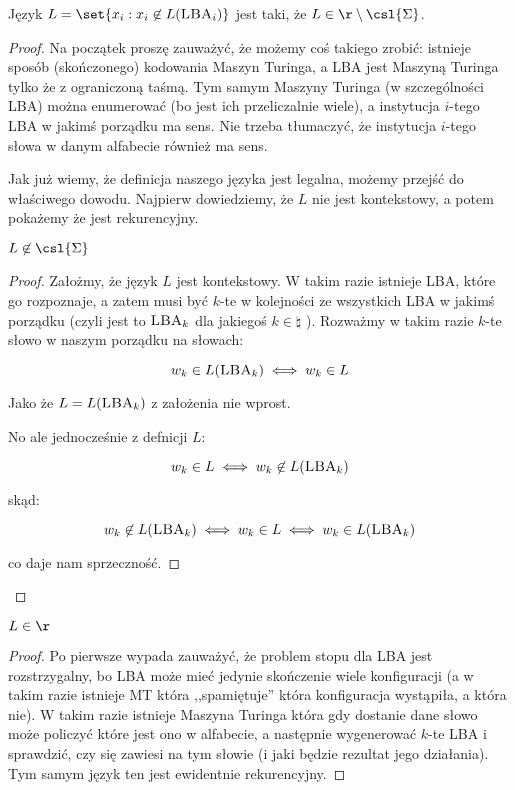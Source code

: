 \begin{theorem}
    Język \( L = \set{x_i : x_i \not \in L(\textsc{LBA}_i)} \) jest taki, że \( L \in \r \setminus \csl{\Sigma}\).
\end{theorem}
\begin{proof}
    Na początek proszę zauważyć, że możemy coś takiego zrobić: istnieje sposób (skończonego) kodowania Maszyn Turinga, a LBA jest Maszyną Turinga tylko że z ograniczoną taśmą. Tym samym Maszyny Turinga (w szczególności LBA) można enumerować (bo jest ich przeliczalnie wiele), a instytucja \(i\)-tego LBA w jakimś porządku ma sens. Nie trzeba tłumaczyć, że instytucja \(i\)-tego słowa w danym alfabecie również ma sens. 
    
    Jak już wiemy, że definicja naszego języka jest legalna, możemy przejść do właściwego dowodu. Najpierw dowiedziemy, że \(L\) nie jest kontekstowy, a potem pokażemy że jest rekurencyjny.
    
    \begin{lemma}
        \( L \not \in \csl{\Sigma}\)
    \end{lemma}
    \begin{proof}
        Założmy, że język \(L\) jest kontekstowy. W takim razie istnieje LBA, które go rozpoznaje, a zatem musi być \(k\)-te w kolejności ze wszystkich LBA w jakimś porządku (czyli jest to \( \textsc{LBA}_k \) dla jakiegoś \(k \in \natural \) ). Rozważmy w takim razie \(k\)-te słowo w naszym porządku na słowach: 
        
        \[ w_k \in L(\textsc{LBA}_k) \iff w_k \in L \]
        
        Jako że \( L = L(\textsc{LBA}_k) \) z założenia nie wprost. 
        
        No ale jednocześnie z defnicji \(L\):
        
        \[
            w_k \in L  \iff w_k \not \in  L(\textsc{LBA}_k)
        \]
        
        skąd: 
        
        \[
           w_k \not \in  L(\textsc{LBA}_k) \iff w_k \in L \iff w_k \in L(\textsc{LBA}_k) 
        \]
        
        co daje nam sprzeczność.
    \end{proof}
\end{proof}

  \begin{lemma}
        \( L \in \r \)
    \end{lemma}
    \begin{proof}
        Po pierwsze wypada zauważyć, że problem stopu dla LBA jest rozstrzygalny, bo LBA może mieć jedynie skończenie wiele konfiguracji (a w takim razie istnieje MT która ,,spamiętuje'' która konfiguracja wystąpiła, a która nie). W takim razie istnieje Maszyna Turinga która gdy dostanie dane słowo może policzyć które jest ono w alfabecie, a następnie wygenerować \(k\)-te LBA i sprawdzić, czy się zawiesi na tym słowie (i jaki będzie rezultat jego działania). Tym samym język ten jest ewidentnie rekurencyjny. 
    \end{proof}

